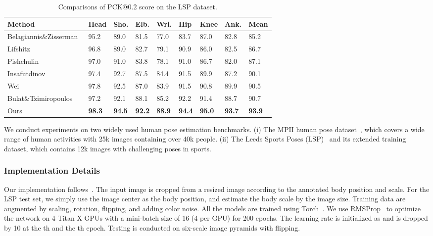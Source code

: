 \documentclass[10pt,twocolumn,letterpaper]{article}
\begin{document}
\begin{table} \begin{footnotesize}
		\centering
		\caption{   Comparisons of PCK@0.2 score on the LSP dataset.}
		\begin{tabular}{@{}p{2.7cm}p{0.3cm}p{0.3cm}p{0.3cm}p{0.3cm}p{0.3cm}p{0.3cm}p{0.3cm}p{0.4cm}}
			\hline
			Method & Head & Sho. & Elb. & Wri. & Hip & Knee & Ank. & Mean \\
			\hline 
			Belagiannis\&Zisserman~\cite{belagiannis2016recurrent} & 95.2 & 89.0 & 81.5 & 77.0 & 83.7 & 87.0 & 82.8 & 85.2 \\
			Lifshitz \etal~\cite{lifshitz2016human} & 96.8 & 89.0 & 82.7 & 79.1 & 90.9 & 86.0 & 82.5 & 86.7 \\
			Pishchulin \etal~\cite{pishchulin2016deepcut} & 97.0 & 91.0 & 83.8 & 78.1 & 91.0 & 86.7 & 82.0 & 87.1 \\
			Insafutdinov \etal~\cite{insafutdinov2016deepercut} & 97.4 & 92.7 & 87.5 & 84.4 & 91.5 & 89.9 & 87.2 & 90.1 \\
			Wei \etal~\cite{wei2016convolutional} & 97.8 & 92.5 & 87.0 & 83.9 & 91.5 & 90.8 & 89.9 & 90.5 \\
			Bulat\&Tzimiropoulos~\cite{bulat2016human} & 97.2 & 92.1 & 88.1 & 85.2 & 92.2 & 91.4 & 88.7 & 90.7 \\
\hline
			Ours & \textbf{98.3}& \textbf{94.5} & \textbf{92.2} & \textbf{88.9} & \textbf{94.4} & \textbf{95.0} & \textbf{93.7} & \textbf{93.9} \\
			\hline      
		\end{tabular}
		\label{tab:LSP}
	\end{footnotesize}
\vspace{-1em}
\end{table}
We conduct experiments on two widely used human pose estimation benchmarks.
(i) The MPII human pose dataset~\cite{andriluka20142d}, which covers a wide range of human activities with 25k images containing over 40k people. 
(ii) The Leeds Sports Poses (LSP)~\cite{Johnson10} and its extended training dataset, which contains 12k images with challenging poses in sports. 

\subsubsection{Implementation Details}
Our implementation follows~\cite{newell2016stacked}. The input image is  cropped from a resized image according to the annotated body position and scale. 
For the LSP test set, we simply use the image center as the body position, and estimate the body scale by the image size. 
Training data are augmented by scaling, rotation, flipping, and adding color noise. 
All the models are trained using Torch~\cite{collobert2011torch7}. 
We use RMSProp~\cite{tieleman2012lecture} to optimize the network on 4 Titan X GPUs with a mini-batch size of 16 (4 per GPU) for 200 epochs. The learning rate is initialized as  and is dropped by 10 at the th and the th epoch. Testing is conducted on six-scale image pyramids with flipping. 
\end{document}
